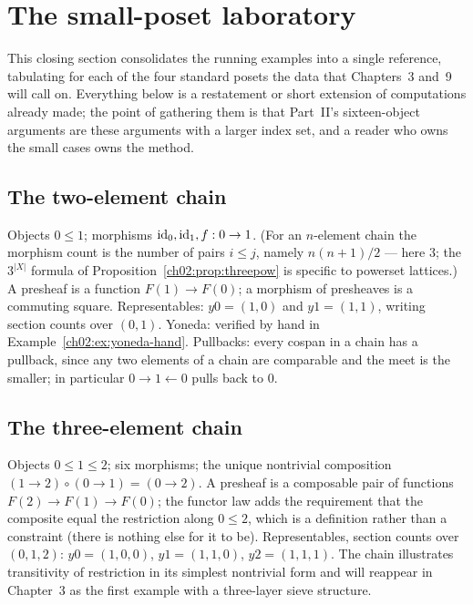 \section{The small-poset laboratory}\label{ch02:sec:laboratory}

This closing section consolidates the running examples into a single
reference, tabulating for each of the four standard posets the data
that Chapters~3 and~9 will call on. Everything below is a restatement
or short extension of computations already made; the point of
gathering them is that Part~II's sixteen-object arguments are these
arguments with a larger index set, and a reader who owns the small
cases owns the method.

\subsection{The two-element chain}\label{ch02:sec:lab-two-chain}

Objects $0 \le 1$; morphisms $\mathrm{id}_0, \mathrm{id}_1, f : 0 \to 1$. (For an
$n$-element chain the morphism count is the number of pairs
$i \le j$, namely $n(n+1)/2$ --- here $3$; the $3^{|X|}$ formula of
Proposition~\ref{ch02:prop:threepow} is specific to powerset
lattices.) A presheaf is a function
$F(1) \to F(0)$; a morphism of presheaves is a commuting square.
Representables: $y0 = (1, 0)$ and $y1 = (1, 1)$, writing section
counts over $(0, 1)$. Yoneda: verified by hand in
Example~\ref{ch02:ex:yoneda-hand}. Pullbacks: every cospan in a chain
has a pullback, since any two elements of a chain are comparable and
the meet is the smaller; in particular
$0 \to 1 \leftarrow 0$ pulls back to $0$.

\subsection{The three-element chain}\label{ch02:sec:lab-three-chain}

Objects $0 \le 1 \le 2$; six morphisms; the unique nontrivial
composition $(1 \to 2) \circ (0 \to 1) = (0 \to 2)$. A presheaf is a
composable pair of functions $F(2) \to F(1) \to F(0)$; the functor law
adds the requirement that the composite equal the restriction along
$0 \le 2$, which is a definition rather than a constraint (there is
nothing else for it to be). Representables, section counts over
$(0,1,2)$: $y0 = (1,0,0)$, $y1 = (1,1,0)$, $y2 = (1,1,1)$. The chain
illustrates transitivity of restriction in its simplest nontrivial
form and will reappear in Chapter~3 as the first example with a
three-layer sieve structure.


